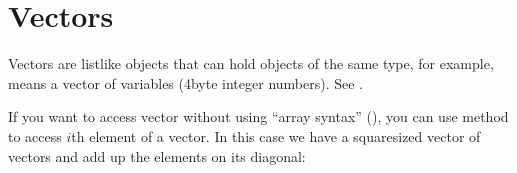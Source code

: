 \documentclass[letterpaper,10pt,english,openany,oneside]{sphinxmanual}
\begin{document}
\section{Vectors}
\label{\detokenize{constructs-week01:vectors}}
\sphinxAtStartPar
Vectors are list\sphinxhyphen{}like objects that can hold objects of the same type, for example,
 means a vector of  variables (4\sphinxhyphen{}byte integer numbers).
See .

\begin{sphinxVerbatim}[commandchars=\\\{\}]
 
\end{sphinxVerbatim}

\begin{sphinxVerbatim}[commandchars=\\\{\}]
   
     
           
      \PYG{p}{[}\PYG{p}{]}
   
\end{sphinxVerbatim}

\sphinxAtStartPar
If you want to access vector without using “array syntax” (),
you can use method  to access \(i\)\sphinxhyphen{}th element of a vector.
In this case we have a square\sphinxhyphen{}sized
vector of vectors and add up the elements on its diagonal:
\end{document}
